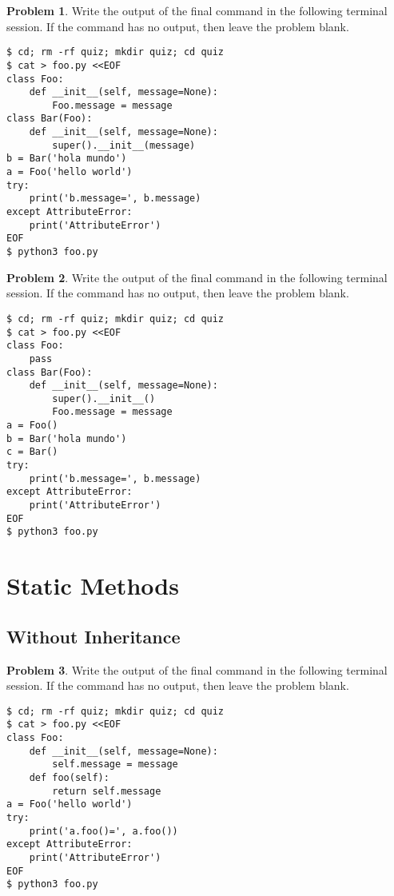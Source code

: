 \documentclass[10pt]{article}
\theoremstyle{definition}
\newtheorem{problem}{Problem}
\begin{document}
\filbreak
\begin{problem}
    Write the output of the final command in the following terminal session.
    If the command has no output, then leave the problem blank.
\end{problem}
\begin{lstlisting}
$ cd; rm -rf quiz; mkdir quiz; cd quiz
$ cat > foo.py <<EOF
class Foo:
    def __init__(self, message=None):
        Foo.message = message
class Bar(Foo):
    def __init__(self, message=None):
        super().__init__(message)
b = Bar('hola mundo')
a = Foo('hello world')
try:
    print('b.message=', b.message)
except AttributeError:
    print('AttributeError') 
EOF
$ python3 foo.py
\end{lstlisting}


\filbreak
\begin{problem}
    Write the output of the final command in the following terminal session.
    If the command has no output, then leave the problem blank.
\end{problem}
\begin{lstlisting}
$ cd; rm -rf quiz; mkdir quiz; cd quiz
$ cat > foo.py <<EOF
class Foo:
    pass
class Bar(Foo):
    def __init__(self, message=None):
        super().__init__()
        Foo.message = message
a = Foo()
b = Bar('hola mundo')
c = Bar()
try:
    print('b.message=', b.message)
except AttributeError:
    print('AttributeError') 
EOF
$ python3 foo.py
\end{lstlisting}


\section{Static Methods}

\subsection{Without Inheritance}

\filbreak
\begin{problem}
    Write the output of the final command in the following terminal session.
    If the command has no output, then leave the problem blank.
\end{problem}
\begin{lstlisting}
$ cd; rm -rf quiz; mkdir quiz; cd quiz
$ cat > foo.py <<EOF
class Foo:
    def __init__(self, message=None):
        self.message = message
    def foo(self):
        return self.message
a = Foo('hello world')
try:
    print('a.foo()=', a.foo())
except AttributeError:
    print('AttributeError') 
EOF
$ python3 foo.py
\end{lstlisting}
\end{document}
